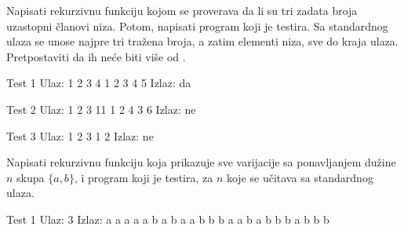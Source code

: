 \begin{Exercise}[label=114]
Napisati rekurzivnu funkciju kojom se proverava da li su tri
  zadata broja uzastopni članovi niza. Potom, napisati program koji
  je testira. Sa standardnog ulaza se unose najpre tri tražena
  broja, a zatim elementi niza, sve do kraja ulaza. Pretpostaviti da
  ih neće biti više od .
  
\begin{miditest}
\begin{test}{Test 1}
Ulaz:     1 2 3 4 1 2 3 4 5 
Izlaz:    da                     
\end{test}
\end{miditest}
\begin{miditest}
\begin{test}{Test 2}
Ulaz:     1 2 3 11 1 2 4 3 6 
Izlaz:    ne                    
\end{test}
\end{miditest}

\begin{miditest}
\begin{test}{Test 3}
Ulaz:     1 2 3 1 2
Izlaz:    ne 
\end{test}
\end{miditest}
\end{Exercise}
\begin{Answer}[ref=114]
\end{Answer}




\begin{Exercise}[label=116]
Napisati rekurzivnu funkciju koja prikazuje sve varijacije sa
   ponavljanjem dužine $n$ skupa $\{a, b\}$, i program koji je
   testira, za $n$ koje se učitava sa standardnog ulaza.

\begin{miditest}
\begin{test}{Test 1}
Ulaz:    3
Izlaz:   a a a
         a a b
         a b a
         a b b
         b a a
         b a b
         b b a
         b b b
\end{test}
\end{miditest}
\end{Exercise}

